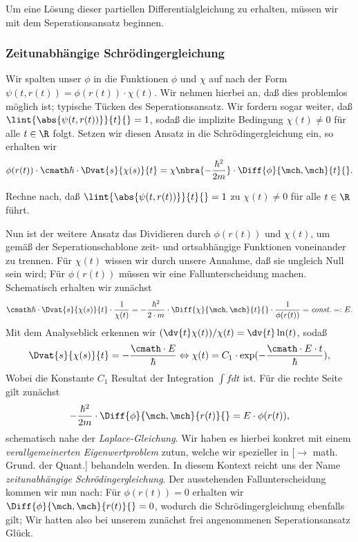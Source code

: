 \documentclass{subfiles}
\begin{document}
    Um eine Lösung dieser partiellen Differentialgleichung zu erhalten, müssen wir mit dem Seperationsansatz beginnen. 

    \subsubsection*{Zeitunabhängige Schrödingergleichung}
        Wir spalten unser $\phi$ in die Funktionen $\phi$ und $\chi$ auf nach der Form $\psi(t,r(t)) = \phi(r(t))\cdot\chi(t)$. Wir nehmen hierbei an, daß dies problemlos möglich ist; typische Tücken des Seperationsansatz. Wir fordern sogar weiter, daß $\lint{\abs{\psi(t,r(t))}}{t}{} = 1$, sodaß die implizite Bedingung $\chi(t)\neq 0$ für alle $t\in\R$ folgt. Setzen wir diesen Ansatz in die Schrödingergleichung ein, so erhalten wir
        \[\phi(r(t))\cdot\cmath\hbar\cdot\Dvat{s}{\chi(s)}{t} = \chi\nbra{-\frac{\hbar^2}{2m}}\cdot\Diff{\phi}{\mch,\mch}{t}{}.\]
        \begin{Aufgabe}
            \nr{} Rechne nach, daß $\lint{\abs{\psi(t,r(t))}}{t}{} = 1$ zu $\chi(t)\neq 0$ für alle $t\in\R$ führt.
        \end{Aufgabe}
        Nun ist der weitere Ansatz das Dividieren durch $\phi(r(t))$ und $\chi(t)$, um gemäß der Seperationschablone zeit- und ortsabhängige Funktionen voneinander zu trennen. Für $\chi(t)$ wissen wir durch unsere Annahme, daß sie ungleich Null sein wird; Für $\phi(r(t))$ müssen wir eine Fallunterscheidung machen. Schematisch erhalten wir zunächst
        \[\cmath\hbar\cdot\Dvat{s}{\chi(s)}{t}\cdot\frac{1}{\chi(t)} = -\frac{\hbar^2}{2\cdot m}\cdot\Diff{\chi}{\mch,\mch}{t}{}\cdot\frac{1}{\phi(r(t))}=\textit{const.} =: E.\]
        Mit dem Analyseblick erkennen wir $(\dv{t}\chi(t))/\chi(t) = \dv{t}\ln(t)$, sodaß 
        \[\Dvat{s}{\chi(s)}{t} = -\frac{\cmath\cdot E}{\hbar} \Leftrightarrow \chi(t) = C_1\cdot\exp(-\frac{\cmath\cdot E\cdot t}{\hbar}),\]
        Wobei die Konstante $C_1$ Resultat der Integration $\int f dt$ ist. Für die rechte Seite gilt zunächst
        \[-\frac{\hbar^2}{2m}\cdot\Diff{\phi}{\mch,\mch}{r(t)}{} = E\cdot\phi(r(t)),\]
        schematisch nahe der \emph{Laplace-Gleichung}. Wir haben es hierbei konkret mit einem \emph{verallgemeinerten Eigenwertproblem} zutun, welche wir spezieller in [$\to$ math. Grund. der Quant.] behandeln werden. In diesem Kontext reicht uns der Name \emph{zeitunabhängige Schrödingergleichung}. Der ausstehenden Fallunterscheidung kommen wir nun nach: Für $\phi(r(t)) = 0$ erhalten wir $\Diff{\phi}{\mch,\mch}{r(t)}{} = 0$, wodurch die Schrödingergleichung ebenfalls gilt; Wir hatten also bei unserem zunächst frei angenommenen Seperationsansatz Glück. 
\end{document}
